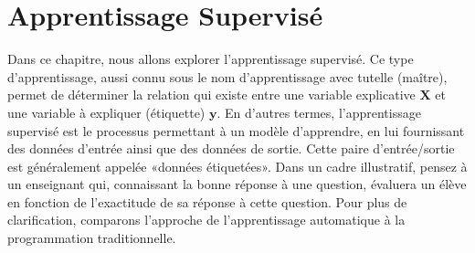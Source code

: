 \documentclass[letterpaper,11pt,english]{sphinxmanual}
\begin{document}
\sphinxstepscope


\section{Apprentissage Supervisé}
\label{\detokenize{chapter3:apprentissage-supervise}}\label{\detokenize{chapter3:ch2}}\label{\detokenize{chapter3::doc}}
\sphinxAtStartPar
Dans ce chapitre, nous allons explorer l’apprentissage supervisé. Ce
type d’apprentissage, aussi connu sous le nom d’apprentissage avec
tutelle (maître), permet de déterminer la relation qui existe entre une
variable explicative \(\mathbf{X}\) et une variable à expliquer
(étiquette) \(\mathbf{y}\). En d’autres termes, l’apprentissage
supervisé est le processus permettant à un modèle d’apprendre, en lui
fournissant des données d’entrée ainsi que des données de sortie. Cette
paire d’entrée/sortie est généralement appelée «données étiquetées».
Dans un cadre illustratif, pensez à un enseignant qui, connaissant la
bonne réponse à une question, évaluera un élève en fonction de
l’exactitude de sa réponse à cette question. Pour plus de clarification,
comparons l’approche de l’apprentissage automatique à la programmation
traditionnelle.
\end{document}
